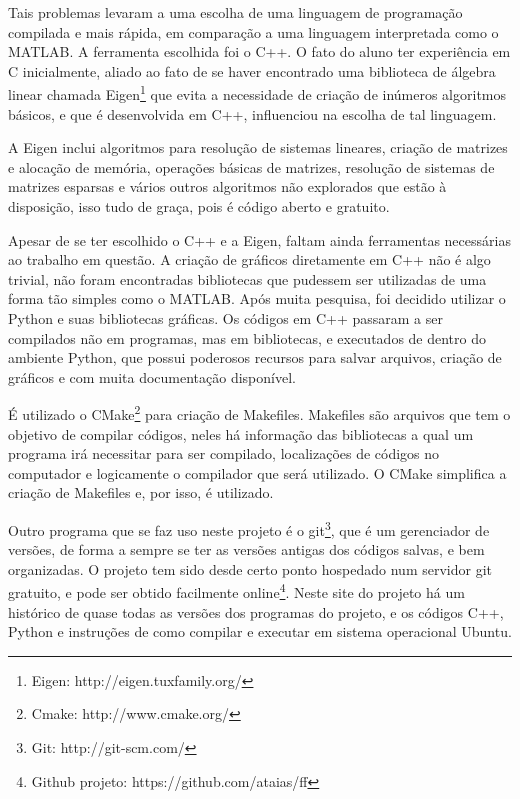 \documentclass[journal]{IEEEtran}
\begin{document}
Tais problemas levaram a uma escolha de uma linguagem de programação compilada e mais rápida, em comparação a uma linguagem interpretada como o MATLAB. A ferramenta escolhida foi o C++. O fato do aluno ter experiência em C inicialmente, aliado ao fato de se haver encontrado uma biblioteca de álgebra linear chamada Eigen\footnote{Eigen: http://eigen.tuxfamily.org/} que evita a necessidade de criação de inúmeros algoritmos básicos, e que é desenvolvida em C++, influenciou na escolha de tal linguagem.

A Eigen inclui algoritmos para resolução de sistemas lineares, criação de matrizes e alocação de memória, operações básicas de matrizes, resolução de sistemas de matrizes esparsas e vários outros algoritmos não explorados que estão à disposição, isso tudo de graça, pois é código aberto e gratuito. 

Apesar de se ter escolhido o C++ e a Eigen, faltam ainda ferramentas necessárias ao trabalho em questão. A criação de gráficos diretamente em C++ não é algo trivial, não foram encontradas bibliotecas que pudessem ser utilizadas de uma forma tão simples como o MATLAB. Após muita pesquisa, foi decidido utilizar o Python e suas bibliotecas gráficas. Os códigos em C++ passaram a ser compilados não em programas, mas em bibliotecas, e executados de dentro do ambiente Python, que possui poderosos recursos para salvar arquivos, criação de gráficos e com muita documentação disponível.

É utilizado o CMake\footnote{Cmake: http://www.cmake.org/} para criação de Makefiles. Makefiles são arquivos que tem o objetivo de compilar códigos, neles há informação das bibliotecas a qual um programa irá necessitar para ser compilado, localizações de códigos no computador e logicamente o compilador que será utilizado. O CMake simplifica a criação de Makefiles e, por isso, é utilizado. 

Outro programa que se faz uso neste projeto é o git\footnote{Git: http://git-scm.com/}, que é um gerenciador de versões, de forma a sempre se ter as versões antigas dos códigos salvas, e bem organizadas. O projeto tem sido desde certo ponto hospedado num servidor git gratuito, e pode ser obtido facilmente online\footnote{Github projeto: https://github.com/ataias/ff}. Neste site do projeto há um histórico de quase todas as versões dos programas do projeto, e os códigos C++, Python e instruções de como compilar e executar em sistema operacional Ubuntu.
\end{document}
